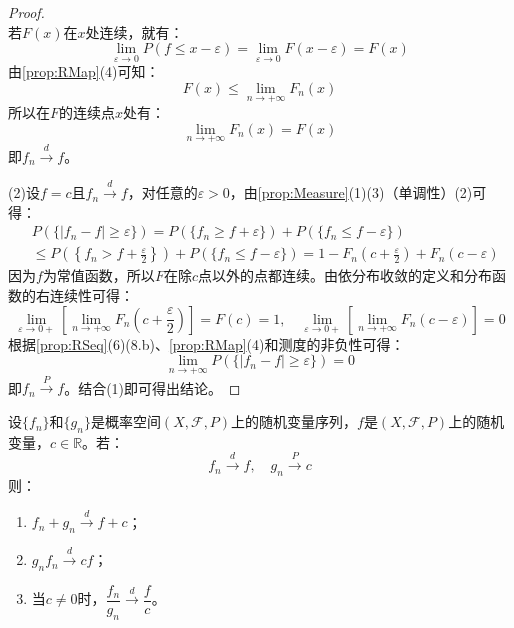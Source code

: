 \begin{proof}
\begin{equation*}
	\end{equation*}
	若$F(x)$在$x$处连续，就有：
	\begin{equation*}
		\lim_{\varepsilon\to0}P(f\leqslant x-\varepsilon)=\lim_{\varepsilon\to0}F(x-\varepsilon)=F(x)
	\end{equation*}
	由\cref{prop:RMap}(4)可知：
	\begin{equation*}
		F(x)\leqslant\lim_{n\to+\infty}F_n(x)
	\end{equation*}
	所以在$F$的连续点$x$处有：
	\begin{equation*}
		\lim_{n\to+\infty}F_n(x)=F(x)
	\end{equation*}
	即$f_n\overset{d}{\longrightarrow}f$。\par
	(2)设$f=c$且$f_n\overset{d}{\longrightarrow}f$，对任意的$\varepsilon>0$，由\cref{prop:Measure}(1)(3)（单调性）(2)可得：
	\begin{align*}
		&P(\{|f_n-f|\geqslant\varepsilon\})=P(\{f_n\geqslant f+\varepsilon\})+P(\{f_n\leqslant f-\varepsilon\}) \\
		&\leqslant P\left(\left\{f_n>f+\frac{\varepsilon}{2}\right\}\right)+P(\{f_n\leqslant f-\varepsilon\})=1-F_n\left(c+\frac{\varepsilon}{2}\right)+F_n(c-\varepsilon)
	\end{align*}
	因为$f$为常值函数，所以$F$在除$c$点以外的点都连续。由依分布收敛的定义和分布函数的右连续性可得：
	\begin{equation*}
		\lim_{\varepsilon\to0+}\left[\lim_{n\to+\infty}F_n\left(c+\frac{\varepsilon}{2}\right)\right]=F(c)=1,\quad\lim_{\varepsilon\to0+}\left[\lim_{n\to+\infty}F_n(c-\varepsilon)\right]=0
	\end{equation*}
	根据\cref{prop:RSeq}(6)(8.b)、\cref{prop:RMap}(4)和测度的非负性可得：
	\begin{equation*}
		\lim_{n\to+\infty}P(\{|f_n-f|\geqslant\varepsilon\})=0
	\end{equation*}
	即$f_n\overset{P}{\longrightarrow}f$。结合(1)即可得出结论。
\end{proof}
\begin{theorem}\label{theo:Slutsky}
	设$\{f_n\}$和$\{g_n\}$是概率空间$(X,\mathscr{F},P)$上的随机变量序列，$f$是$(X,\mathscr{F},P)$上的随机变量，$c\in\mathbb{R}$。若：
	\begin{equation*}
		f_n\overset{d}{\longrightarrow}f,\quad g_n\overset{P}{\longrightarrow}c
	\end{equation*}
	则：
	\begin{enumerate}
		\item $f_n+g_n\overset{d}{\longrightarrow}f+c$；
		\item $g_nf_n\overset{d}{\longrightarrow}cf$；
		\item 当$c\ne0$时，$\dfrac{f_n}{g_n}\overset{d}{\longrightarrow}\dfrac{f}{c}$。
	\end{enumerate}
\end{theorem}
